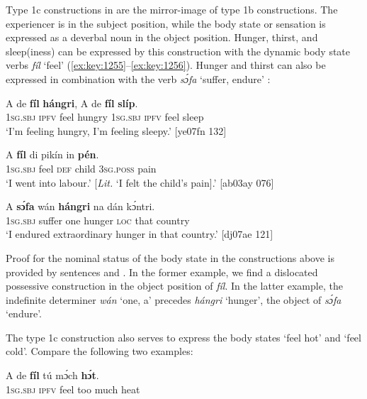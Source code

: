 Type 1c constructions in  are the mirror-image of type 1b constructions. The experiencer is in the subject position, while the body state or sensation is expressed as a deverbal noun in the object position. Hunger, thirst, and sleep(iness) can be expressed by this construction with the dynamic body state verbs \textit{fíl} ‘feel’ (\ref{ex:key:1255}–\ref{ex:key:1256}). Hunger and thirst can also be expressed in combination with the verb \textit{sɔ́fa} ‘suffer, endure’ :


\ea%
    \label{ex:key:1255}
    \gll A    de  \textbf{fíl}  \textbf{hángri},  A    de  \textbf{fíl}  \textbf{slíp}.\\
\textsc{1sg.sbj}  \textsc{ipfv}  feel  hungry  \textsc{1sg.sbj}  \textsc{ipfv}  feel  sleep\\

\glt ‘I’m feeling hungry, I’m feeling sleepy.’ [ye07fn 132]
\z


\ea%
    \label{ex:key:1256}
    \gll A    \textbf{fíl}  di  pikín  in    \textbf{pén}.\\
\textsc{1sg.sbj}  feel  \textsc{def}  child  \textsc{3sg.poss}  pain\\

\glt ‘I went into labour.’ [\textit{Lit.} ‘I felt the child’s pain].’ [ab03ay 076]
\z


\ea%
    \label{ex:key:1257}
    \gll A    \textbf{sɔ́fa}    wán    \textbf{hángri}  na  dán  kɔ́ntri. \\
\textsc{1sg.sbj}  suffer  one    hunger  \textsc{loc}  that  country\\

\glt ‘I endured extraordinary hunger in that country.’ [dj07ae 121]
\z

Proof for the nominal status of the body state in the constructions above is provided by sentences  and . In the former example, we find a dislocated possessive construction in the object position of \textit{fíl}. In the latter example, the indefinite determiner \textit{wán} ‘one, a’ precedes \textit{hángri} ‘hunger’, the object of \textit{sɔ́fa} ‘endure’.


The type 1c construction also serves to express the body states ‘feel hot’ and ‘feel cold’. Compare the following two examples:



\ea%
    \label{ex:key:1258}
    \gll A    de  \textbf{fíl}  tú  mɔ́ch  \textbf{hɔ́t}.\\
\textsc{1sg.sbj}  \textsc{ipfv}  feel  too  much  heat\\

